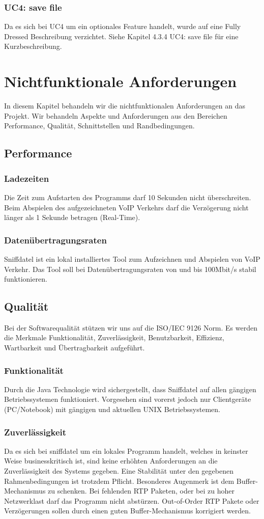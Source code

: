 \documentclass[a4,12pt]{scrartcl}
\begin{document}
\subsubsection{UC4: save file}
Da es sich bei UC4 um ein optionales Feature handelt, wurde auf eine Fully Dressed Beschreibung verzichtet. Siehe Kapitel 4.3.4 UC4: save file für eine Kurzbeschreibung. 
\section{Nichtfunktionale Anforderungen}
In diesem Kapitel behandeln wir die nichtfunktionalen Anforderungen an das Projekt. Wir behandeln Aspekte und Anforderungen aus den Bereichen Performance, Qualität, Schnittstellen und Randbedingungen.
\subsection{Performance}
\subsubsection{Ladezeiten}
Die Zeit zum Aufstarten des Programms darf 10 Sekunden nicht überschreiten. Beim Abspielen des aufgezeichneten VoIP Verkehrs darf die Verzögerung nicht länger als 1 Sekunde betragen (Real-Time).
\subsubsection{Datenübertragungsraten}
Sniffdatel ist ein lokal installiertes Tool zum Aufzeichnen und Abspielen von VoIP Verkehr. Das Tool soll bei Datenübertragungsraten von und bis 100Mbit/s stabil funktionieren.
\subsection{Qualität}
Bei der Softwarequalität stützen wir uns auf die ISO/IEC 9126 Norm. Es werden die Merkmale Funktionalität, Zuverlässigkeit, Benutzbarkeit, Effizienz, Wartbarkeit und Übertragbarkeit aufgeführt.
\subsubsection{Funktionalität}
Durch die Java Technologie wird sichergestellt, dass Sniffdatel auf allen gängigen Betriebssystemen funktioniert. Vorgesehen sind vorerst jedoch nur Clientgeräte (PC/Notebook) mit gängigen und aktuellen UNIX Betriebssystemen. 
\subsubsection{Zuverlässigkeit}
Da es sich bei sniffdatel um ein lokales Programm handelt, welches in keinster Weise businesskritisch ist, sind keine erhöhten Anforderungen an die Zuverlässigkeit des Systems gegeben. Eine Stabilität unter den gegebenen Rahmenbedingungen ist trotzdem Pflicht. Besonderes Augenmerk ist dem Buffer-Mechanismus zu schenken. Bei fehlenden RTP Paketen, oder bei zu hoher Netzwerklast darf das Programm nicht abstürzen. Out-of-Order RTP Pakete oder Verzögerungen sollen durch einen guten Buffer-Mechanismus korrigiert werden.
\end{document}
